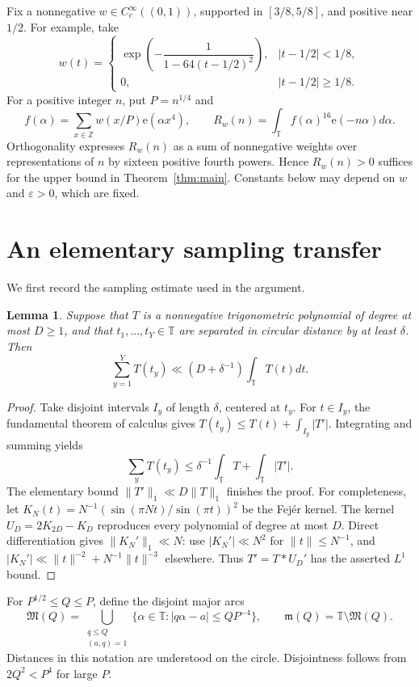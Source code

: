 \documentclass[11pt]{article}
\newtheorem{lemma}{Lemma}
\theoremstyle{remark}\newtheorem*{remark}{Remark}
\newcommand{\e}{\mathrm e}
\newcommand{\T}{\mathbb T}
\newcommand{\eps}{\varepsilon}
\newcommand{\M}{\mathfrak M}
\newcommand{\m}{\mathfrak m}
\begin{document}
Fix a nonnegative \(w\in C_c^\infty((0,1))\), supported in
\([3/8,5/8]\), and positive near \(1/2\). For example, take
\[
 w(t)=
 \begin{cases}
 \exp\!\left(-\dfrac1{1-64(t-1/2)^2}\right),&|t-1/2|<1/8,\\
 0,&|t-1/2|\ge1/8.
 \end{cases}
\]
For a positive integer \(n\), put \(P=n^{1/4}\) and
\[
 f(\alpha)=\sum_{x\in\mathbb Z}w(x/P)\e(\alpha x^4),\qquad
 R_w(n)=\int_\T f(\alpha)^{16}\e(-n\alpha)d\alpha.
\]
Orthogonality expresses \(R_w(n)\) as a sum of nonnegative weights over
representations of \(n\) by sixteen positive fourth powers. Hence
\(R_w(n)>0\) suffices for the upper bound in Theorem~\ref{thm:main}.
Constants below may depend on \(w\) and \(\eps>0\), which are fixed.

\section{An elementary sampling transfer}

We first record the sampling estimate used in the argument.
\begin{lemma}\label{lem:sampling}
Suppose that \(T\) is a nonnegative trigonometric polynomial of degree at
most \(D\ge1\), and that \(t_1,\ldots,t_Y\in\T\) are separated in circular
distance by at least \(\delta\). Then
\[
 \sum_{y=1}^Y T(t_y)\ll (D+\delta^{-1})\int_\T T(t)dt.
\]
\end{lemma}
\begin{proof}
Take disjoint intervals \(I_y\) of length \(\delta\), centered at \(t_y\).
For \(t\in I_y\), the fundamental theorem of calculus gives
\(T(t_y)\le T(t)+\int_{I_y}|T'|\). Integrating and summing yields
\[
 \sum_yT(t_y)\le\delta^{-1}\int_\T T+\int_\T|T'|.
\]
The elementary bound \(\|T'\|_1\ll D\|T\|_1\) finishes the proof.
For completeness, let \(K_N(t)=N^{-1}(\sin(\pi Nt)/\sin(\pi t))^2\)
be the Fej\'er kernel. The kernel \(U_D=2K_{2D}-K_D\) reproduces every
polynomial of degree at most \(D\). Direct differentiation gives
\(\|K_N'\|_1\ll N\): use \(|K_N'|\ll N^2\) for \(\|t\|\le N^{-1}\),
and \(|K_N'|\ll\|t\|^{-2}+N^{-1}\|t\|^{-3}\) elsewhere.
Thus \(T'=T*U_D'\) has the asserted \(L^1\) bound.
\end{proof}

For \(P^{1/2}\le Q\le P\), define the disjoint major arcs
\begin{equation}\label{eq:arcs}
 \M(Q)=\bigcup_{\substack{q\le Q\\(a,q)=1}}
 \{\alpha\in\T:|q\alpha-a|\le QP^{-4}\},\qquad
 \m(Q)=\T\setminus\M(Q).
\end{equation}
Distances in this notation are understood on the circle. Disjointness
follows from \(2Q^2<P^4\) for large \(P\).
\end{document}
